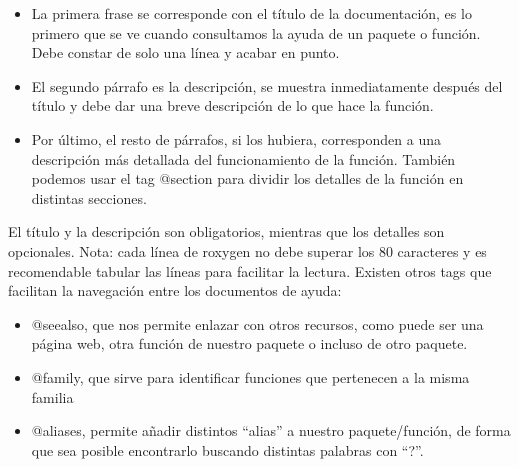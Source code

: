 \begin{itemize}
    \item La primera frase se corresponde con el t\'itulo de la documentaci\'on, es lo primero que
se ve cuando consultamos la ayuda de un paquete o funci\'on. Debe constar de solo
una l\'inea y acabar en punto.
    \item El segundo p\'arrafo es la descripci\'on, se muestra inmediatamente despu\'es del t\'itulo y
debe dar una breve descripci\'on de lo que hace la funci\'on.
    \item Por \'ultimo, el resto de p\'arrafos, si los hubiera, corresponden a una descripci\'on m\'as
detallada del funcionamiento de la funci\'on. Tambi\'en podemos usar el tag @section
para dividir los detalles de la funci\'on en distintas secciones.
\end{itemize}

El t\'itulo y la descripci\'on son obligatorios, mientras que los detalles son opcionales.
Nota: cada l\'inea de roxygen no debe superar los 80 caracteres y es recomendable tabular
las l\'ineas para facilitar la lectura.
Existen otros tags que facilitan la navegaci\'on entre los documentos de ayuda:

\begin{itemize}
    \item @seealso, que nos permite enlazar con otros recursos, como puede ser una p\'agina
web, otra funci\'on de nuestro paquete o incluso de otro paquete.
    \item @family, que sirve para identificar funciones que pertenecen a la misma familia
    \item @aliases, permite a\~nadir distintos “alias” a nuestro paquete/funci\'on, de forma que
sea posible encontrarlo buscando distintas palabras con “?”.
\end{itemize}

